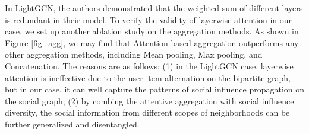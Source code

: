 \documentclass[letterpaper]{article} %
\begin{document}
In LightGCN, the authors demonstrated that the weighted sum of different layers is redundant in their model. To verify the validity of layerwise attention in our case, we set up another ablation study on the aggregation methods. As shown in Figure \ref{fig_agg}, we may find that Attention-based aggregation outperforms any other aggregation methods, including Mean pooling, Max pooling, and Concatenation. The reasons are as follows: (1) in the LightGCN case, layerwise attention is ineffective due to the user-item alternation on the bipartite graph, but in our case, it can well capture the patterns of social influence propagation on the social graph; (2) by combing the attentive aggregation with social influence diversity, the social information from different scopes of neighborhoods can be further generalized and disentangled.
\end{document}
